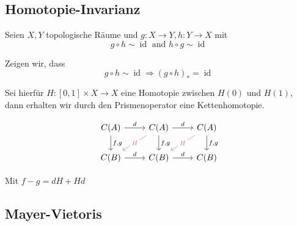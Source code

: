 \documentclass{article}
\DeclareMathOperator{\id}{id}
\begin{document}
	\subsection{Homotopie-Invarianz}
	
	Seien $X, Y$ topologische Räume und $g: X→Y, h: Y→X$ mit
	\begin{equation*}
		g ∘ h \sim \id \text{ and } h∘g \sim \id
	\end{equation*}
	
	Zeigen wir, dass
	\begin{equation*}
		g∘h \sim \id ⇒ (g∘h)_* = \id
	\end{equation*}
	
	Sei hierfür $H: [0,1] × X → X$ eine Homotopie zwischen $H(0)$ und $H(1)$, dann erhalten wir durch den Prismenoperator eine Kettenhomotopie.
	
	\[\begin{tikzcd}
		{C(A)} & {C(A)} & {C(A)} \\
		{C(B)} & {C(B)} & {C(B)}
		\arrow["d", from=1-1, to=1-2]
		\arrow["{f,g}", from=1-1, to=2-1]
		\arrow["d", from=1-2, to=1-3]
		\arrow["H"{description}, color={rgb,255:red,214;green,92;blue,92}, from=1-2, to=2-1]
		\arrow["{f,g}", from=1-2, to=2-2]
		\arrow["H"{description}, color={rgb,255:red,214;green,92;blue,92}, from=1-3, to=2-2]
		\arrow["{f,g}", from=1-3, to=2-3]
		\arrow["d", from=2-1, to=2-2]
		\arrow["d", from=2-2, to=2-3]
	\end{tikzcd}\]
	
	Mit $f-g = dH + Hd$
	
	\subsection{Mayer-Vietoris}
	\label{sec:mvb1}
	
\end{document}
